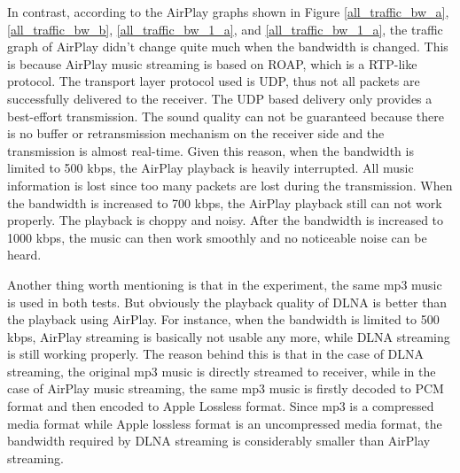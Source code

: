 In contrast, according to the AirPlay graphs shown in Figure
\ref{all_traffic_bw_a}, \ref{all_traffic_bw_b}, \ref{all_traffic_bw_1_a}, and \ref{all_traffic_bw_1_a}, the traffic graph of AirPlay didn't change quite much when the bandwidth is changed. This is because AirPlay music streaming is based on ROAP, which is a RTP-like protocol. The transport layer protocol used is UDP, thus not all packets are successfully delivered to the receiver. The UDP based delivery only provides a best-effort transmission. The sound quality can not be guaranteed because there is no buffer or retransmission mechanism on the receiver side and the transmission is almost real-time. Given this reason, when the bandwidth is limited to 500 kbps, the AirPlay playback is heavily interrupted. All music information is lost since too many packets are lost during the transmission. When the bandwidth is increased to 700 kbps, the AirPlay playback still can not work properly. The playback is choppy and noisy. After the bandwidth is increased to 1000 kbps, the music can then work smoothly and no noticeable noise can be heard.

Another thing worth mentioning is that in the experiment, the same mp3 music is used in both tests. But obviously the playback quality of DLNA is better than the playback using AirPlay. For instance, when the bandwidth is limited to 500 kbps, AirPlay streaming is basically not usable any more, while DLNA streaming is still working properly. The reason behind this is that in the case of DLNA streaming, the original mp3 music is directly streamed to receiver, while in the case of AirPlay music streaming, the same mp3 music is firstly decoded to PCM format and then encoded to Apple Lossless format. Since mp3 is a compressed media format while Apple lossless format is an uncompressed media format, the bandwidth required by DLNA streaming is considerably smaller than AirPlay streaming.

